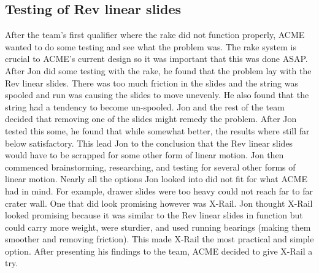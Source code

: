\documentclass{article}
\begin{document}
\subsection{Testing of Rev linear slides}
After the team's first qualifier where the rake did not function properly, ACME wanted to do some testing and see what the problem was. The rake system is crucial to ACME's current design so it was important that this was done ASAP. After Jon did some testing with the rake, he found that the problem lay with the Rev linear slides. There was too much friction in the slides and the string was spooled and run was causing the slides to move unevenly. He also found that the string had a tendency to become un-spooled. Jon and the rest of the team decided that removing one of the slides might remedy the problem. After Jon tested this some, he found that while somewhat better, the results where still far below satisfactory. This lead Jon to the conclusion that the Rev linear slides would have to be scrapped for some other form of linear motion. Jon then commenced brainstorming, researching, and testing for several other forms of linear motion. Nearly all the options Jon looked into did not fit for what ACME had in mind. For example, drawer slides were too heavy could not reach far to far crater wall. One that did look promising however was X-Rail. Jon thought X-Rail looked promising because it was similar to the Rev linear slides in function but could carry more weight, were sturdier, and used running bearings (making them smoother and removing friction). This made X-Rail the most practical and simple option. After presenting his findings to the team, ACME decided to give X-Rail a try. 
\end{document}
